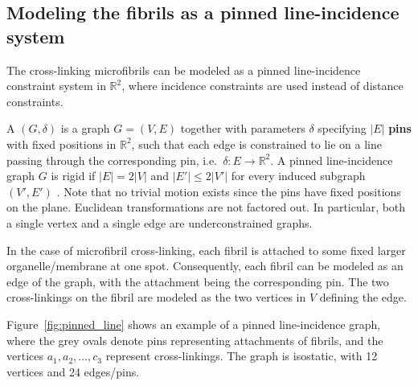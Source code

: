 \subsection{Modeling the fibrils as a pinned line-incidence system}



The cross-linking microfibrils can be modeled as a pinned line-incidence constraint system in $\mathbb{R}^2$, where incidence constraints are used instead of distance constraints.

A  $(G,\delta)$ is a graph $G=(V,E)$ together with parameters $\delta$ specifying $|E|$ \textbf{pins} with fixed positions in $\mathbb{R}^2$, such that each edge is constrained to lie on a line passing through the corresponding pin, i.e.\ $\delta: E \rightarrow \mathbb{R}^2$.
%
%
A pinned line-incidence graph $G$ is rigid if $|E| = 2|V|$ and $|E'| \le 2|V'|$ for every induced subgraph $(V',E')$ \cite{sitharam2014incidence}. Note that no trivial motion exists since the pins have fixed positions on the plane. Euclidean transformations are not factored out. In particular, both a single vertex and a single edge are underconstrained graphs.




In the case of microfibril cross-linking, each fibril is attached to some fixed larger organelle/membrane at one spot. Consequently, each fibril can be modeled as an edge of the graph, with the attachment being the corresponding pin. The two cross-linkings on the fibril are modeled as the two vertices in $V$ defining the edge.



Figure~\ref{fig:pinned_line} shows an example of a pinned line-incidence graph, where the grey ovals denote pins representing attachments of fibrils, and the vertices $a_1,a_2,\ldots, c_3$ represent cross-linkings.
The graph is isostatic, with 12 vertices and 24 edges/pins.

